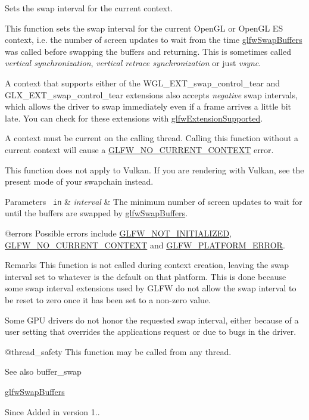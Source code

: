 Sets the swap interval for the current context. 

This function sets the swap interval for the current Open\+GL or Open\+GL ES context, i.\+e. the number of screen updates to wait from the time \mbox{\hyperlink{group__window_gafb827800eedbfcbc97b1e5408df668d7}{glfw\+Swap\+Buffers}} was called before swapping the buffers and returning. This is sometimes called {\itshape vertical synchronization}, {\itshape vertical retrace synchronization} or just {\itshape vsync}.

A context that supports either of the {\ttfamily W\+G\+L\+\_\+\+E\+X\+T\+\_\+swap\+\_\+control\+\_\+tear} and {\ttfamily G\+L\+X\+\_\+\+E\+X\+T\+\_\+swap\+\_\+control\+\_\+tear} extensions also accepts {\itshape negative} swap intervals, which allows the driver to swap immediately even if a frame arrives a little bit late. You can check for these extensions with \mbox{\hyperlink{group__context_ga9a28c712d35f9e43534e1d03b051c04c}{glfw\+Extension\+Supported}}.

A context must be current on the calling thread. Calling this function without a current context will cause a \mbox{\hyperlink{group__errors_gaa8290386e9528ccb9e42a3a4e16fc0d0}{G\+L\+F\+W\+\_\+\+N\+O\+\_\+\+C\+U\+R\+R\+E\+N\+T\+\_\+\+C\+O\+N\+T\+E\+XT}} error.

This function does not apply to Vulkan. If you are rendering with Vulkan, see the present mode of your swapchain instead.


\begin{DoxyParams}[1]{Parameters}
\mbox{\texttt{ in}}  & {\em interval} & The minimum number of screen updates to wait for until the buffers are swapped by \mbox{\hyperlink{group__window_gafb827800eedbfcbc97b1e5408df668d7}{glfw\+Swap\+Buffers}}.\\
\hline
\end{DoxyParams}
@errors Possible errors include \mbox{\hyperlink{group__errors_ga2374ee02c177f12e1fa76ff3ed15e14a}{G\+L\+F\+W\+\_\+\+N\+O\+T\+\_\+\+I\+N\+I\+T\+I\+A\+L\+I\+Z\+ED}}, \mbox{\hyperlink{group__errors_gaa8290386e9528ccb9e42a3a4e16fc0d0}{G\+L\+F\+W\+\_\+\+N\+O\+\_\+\+C\+U\+R\+R\+E\+N\+T\+\_\+\+C\+O\+N\+T\+E\+XT}} and \mbox{\hyperlink{group__errors_gad44162d78100ea5e87cdd38426b8c7a1}{G\+L\+F\+W\+\_\+\+P\+L\+A\+T\+F\+O\+R\+M\+\_\+\+E\+R\+R\+OR}}.

\begin{DoxyRemark}{Remarks}
This function is not called during context creation, leaving the swap interval set to whatever is the default on that platform. This is done because some swap interval extensions used by G\+L\+FW do not allow the swap interval to be reset to zero once it has been set to a non-\/zero value.

Some G\+PU drivers do not honor the requested swap interval, either because of a user setting that overrides the application\textquotesingle{}s request or due to bugs in the driver.
\end{DoxyRemark}
@thread\+\_\+safety This function may be called from any thread.

\begin{DoxySeeAlso}{See also}
buffer\+\_\+swap 

\mbox{\hyperlink{group__window_gafb827800eedbfcbc97b1e5408df668d7}{glfw\+Swap\+Buffers}}
\end{DoxySeeAlso}
\begin{DoxySince}{Since}
Added in version 1.. 
\end{DoxySince}
